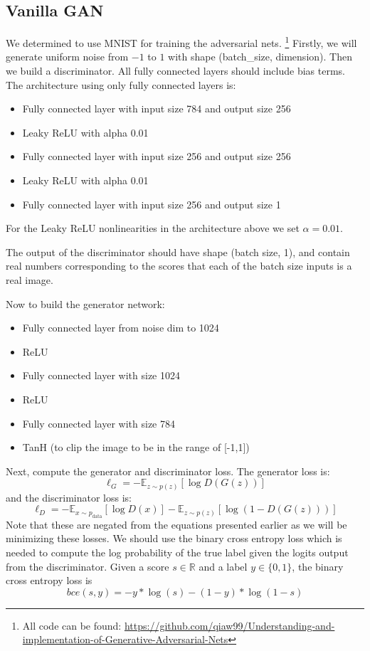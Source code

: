 \documentclass[10pt,twocolumn,letterpaper]{article}
\begin{document}
\subsection{Vanilla GAN}
We determined to use MNIST\cite{726791} for training the adversarial nets. \footnote{All code can be found: \href{https://github.com/qiaw99/Understanding-and-implementation-of-Generative-Adversarial-Nets}{https://github.com/qiaw99/Understanding-and-implementation-of-Generative-Adversarial-Nets}} Firstly, we will generate uniform noise from $-1$ to $1$ with shape (batch\_size, dimension). Then we build a discriminator.
All fully connected layers should include bias terms. The architecture using only fully connected layers is:
\begin{itemize}
    \item Fully connected layer with input size 784 and output size 256
    \item Leaky ReLU with alpha 0.01
    \item Fully connected layer with input size 256 and output size 256
    \item Leaky ReLU with alpha 0.01 
    \item Fully connected layer with input size 256 and output size 1
\end{itemize}
For the Leaky ReLU nonlinearities in the architecture above we set $\alpha=0.01$.
 
The output of the discriminator should have shape (batch size, 1), and contain real numbers corresponding to the scores that each of the batch size inputs is a real image.

Now to build the generator network:
\begin{itemize}
    \item Fully connected layer from noise dim to 1024
    \item ReLU
    \item Fully connected layer with size 1024
    \item ReLU
    \item Fully connected layer with size 784
    \item TanH (to clip the image to be in the range of [-1,1])
\end{itemize}

Next, compute the generator and discriminator loss. The generator loss is:
$$\ell_G  =  -\mathbb{E}_{z \sim p(z)}\left[\log D(G(z))\right]$$
and the discriminator loss is:
$$ \ell_D = -\mathbb{E}_{x \sim p_\text{data}}\left[\log D(x)\right] - \mathbb{E}_{z \sim p(z)}\left[\log \left(1-D(G(z))\right)\right]$$
Note that these are negated from the equations presented earlier as we will be minimizing these losses. We should use the binary cross entropy loss which is needed to compute the log probability of the true label given the logits output from the discriminator. Given a score $s\in\mathbb{R}$ and a label $y\in\{0, 1\}$, the binary cross entropy loss is
$$ bce(s, y) = -y * \log(s) - (1 - y) * \log(1 - s) $$
\end{document}
